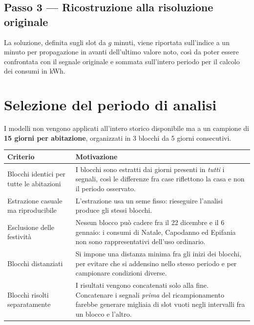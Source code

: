 \subsection*{Passo 3 --- Ricostruzione alla risoluzione originale}

La soluzione, definita sugli slot da $g$ minuti, viene riportata sull'indice a un minuto per
propagazione in avanti dell'ultimo valore noto, così da poter essere confrontata con il segnale
originale e sommata sull'intero periodo per il calcolo dei consumi in kWh.

\section{Selezione del periodo di analisi}

I modelli non vengono applicati all'intero storico disponibile ma a un campione di
\textbf{15 giorni per abitazione}, organizzati in 3 blocchi da 5 giorni consecutivi.

\begin{center}
\begin{tabularx}{\textwidth}{@{}l X@{}}
\toprule
\textbf{Criterio} & \textbf{Motivazione} \\
\midrule
Blocchi identici per tutte le abitazioni
& I blocchi sono estratti dai giorni presenti in \emph{tutti} i segnali, così le differenze fra
  case riflettono la casa e non il periodo osservato. \\
\addlinespace
Estrazione casuale ma riproducibile
& L'estrazione usa un seme fisso: rieseguire l'analisi produce gli stessi blocchi. \\
\addlinespace
Esclusione delle festività
& Nessun blocco può cadere fra il 22 dicembre e il 6 gennaio: i consumi di Natale, Capodanno ed
  Epifania non sono rappresentativi dell'uso ordinario. \\
\addlinespace
Blocchi distanziati
& Si impone una distanza minima fra gli inizi dei blocchi, per evitare che si addensino nello
  stesso periodo e per campionare condizioni diverse. \\
\addlinespace
Blocchi risolti separatamente
& I risultati vengono concatenati solo alla fine. Concatenare i segnali \emph{prima} del
  ricampionamento farebbe generare migliaia di slot vuoti negli intervalli fra un blocco e
  l'altro. \\
\bottomrule
\end{tabularx}
\end{center}
